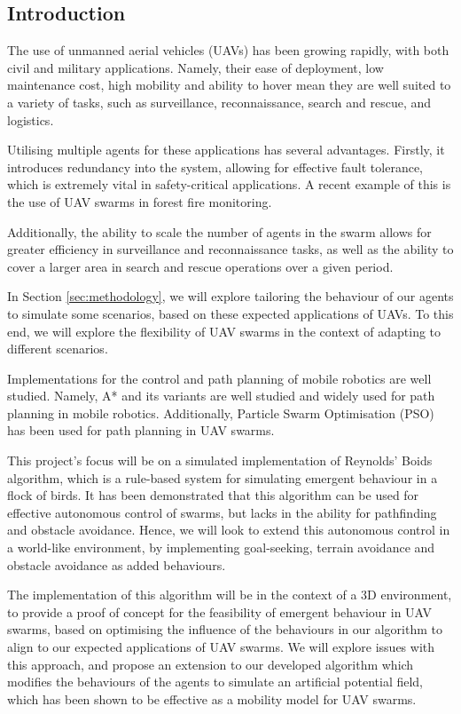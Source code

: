 \documentclass[12pt]{article}
\begin{document}
\subsection{Introduction}
\label{sec:introduction}
The use of unmanned aerial vehicles (UAVs) has been growing rapidly, with both civil and military applications. Namely, their ease of deployment, low maintenance cost, high mobility and ability to hover mean they are well suited to a variety of tasks, such as surveillance, reconnaissance, search and rescue, and logistics\cite{Hayat}.

Utilising multiple agents for these applications has several advantages. Firstly, it introduces redundancy into the system, allowing for effective fault tolerance, which is extremely vital in safety-critical applications\cite{Perez}. A recent example of this is the use of UAV swarms in forest fire monitoring\cite{Hu}.

Additionally, the ability to scale the number of agents in the swarm allows for greater efficiency in surveillance and reconnaissance tasks, as well as the ability to cover a larger area in search and rescue operations over a given period.

In Section \ref{sec:methodology}, we will explore tailoring the behaviour of our agents to simulate some scenarios, based on these expected applications of UAVs. To this end, we will explore the flexibility of UAV swarms in the context of adapting to different scenarios.

Implementations for the control and path planning of mobile robotics are well studied. Namely, A* and its variants are well studied and widely used for path planning in mobile robotics\cite{Chen}. Additionally, Particle Swarm Optimisation (PSO) has been used for path planning in UAV swarms\cite{Pyke}.

This project's focus will be on a simulated implementation of Reynolds' Boids\cite{Reynolds} algorithm, which is a rule-based system for simulating emergent behaviour in a flock of birds. It has been demonstrated that this algorithm can be used for effective autonomous control of swarms\cite{Basu}, but lacks in the ability for pathfinding and obstacle avoidance\cite{Pyke}. Hence, we will look to extend this autonomous control in a world-like environment, by implementing goal-seeking, terrain avoidance and obstacle avoidance as added behaviours.

The implementation of this algorithm will be in the context of a 3D environment, to provide a proof of concept for the feasibility of emergent behaviour in UAV swarms, based on optimising the influence of the behaviours in our algorithm to align to our expected applications of UAV swarms. We will explore issues with this approach, and propose an extension to our developed algorithm which modifies the behaviours of the agents to simulate an artificial potential field, which has been shown to be effective as a mobility model for UAV swarms\cite{Falomir}.
\end{document}
